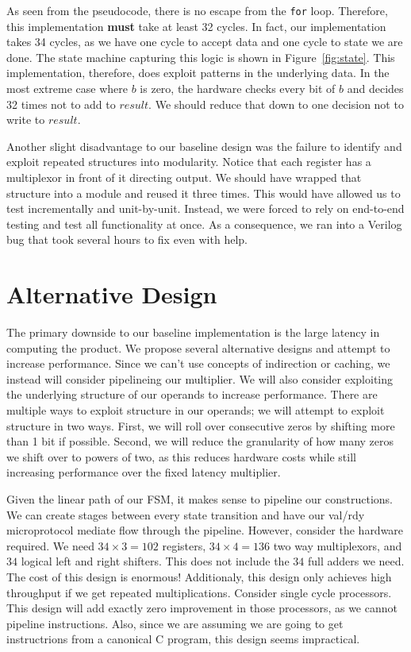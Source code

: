 \documentclass[11pt]{article}
\begin{document}
As seen from the pseudocode, there is no escape from the \verb+for+ loop.
Therefore, this implementation \textbf{must} take at least 32 cycles.
In fact, our implementation takes 34 cycles, as we have one cycle to accept data and one cycle to state we are done.
The state machine capturing this logic is shown in Figure~\ref{fig:state}. 
This implementation, therefore, does exploit patterns in the underlying data.
In the most extreme case where $b$ is zero, the hardware checks every bit of $b$ and decides 32 times not to add to $result$.
We should reduce that down to one decision not to write to $result$.

Another slight disadvantage to our baseline design was the failure to identify and exploit repeated structures into modularity.
Notice that each register has a multiplexor in front of it directing output.
We should have wrapped that structure into a module and reused it three times. 
This would have allowed us to test incrementally and unit-by-unit.
Instead, we were forced to rely on end-to-end testing and test all functionality at once.
As a consequence, we ran into a Verilog bug that took several hours to fix even with help.  
 

\section{Alternative Design}

The primary downside to our baseline implementation is the large latency in computing the product.
We propose several alternative designs and attempt to increase performance.
Since we can't use concepts of indirection or caching, we instead will consider pipelineing our multiplier.
We will also consider exploiting the underlying structure of our operands to increase performance.
There are multiple ways to exploit structure in our operands; we will attempt to exploit structure in two ways.
First, we will roll over consecutive zeros by shifting more than 1 bit if possible.
Second, we will reduce the granularity of how many zeros we shift over to powers of two, as this reduces hardware costs
while still increasing performance over the fixed latency multiplier.

Given the linear path of our FSM, it makes sense to pipeline our constructions.
We can create stages between every state transition and have our val/rdy microprotocol mediate flow through the pipeline.
However, consider the hardware required. We need $34 \times 3 = 102$ registers, $34 \times 4 = 136$ two way multiplexors,
and $34$ logical left and right shifters.
This does not include the $34$ full adders we need. 
The cost of this design is enormous!
Additionaly, this design only achieves high throughput if we get repeated multiplications.
Consider single cycle processors.
This design will add exactly zero improvement in those processors, as we cannot pipeline instructions. 
Also, since we are assuming we are going to get instructrions from a canonical C program, this design seems impractical.
\end{document}
